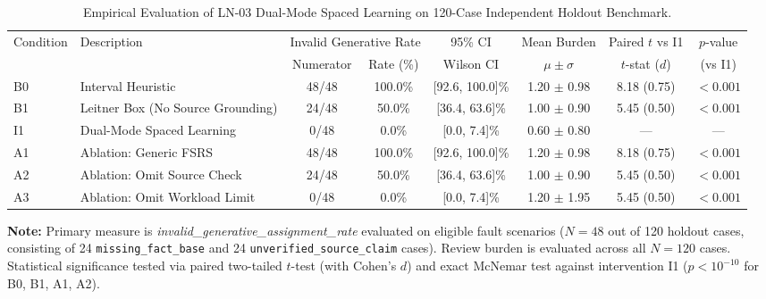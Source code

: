 \begin{table}[t]
\centering
\small
\caption{Empirical Evaluation of LN-03 Dual-Mode Spaced Learning on 120-Case Independent Holdout Benchmark.}
\label{tab:ln03-holdout-benchmark}
\begin{tabular}{llcccccc}
\toprule
Condition & Description & \multicolumn{2}{c}{Invalid Generative Rate} & 95\% CI & Mean Burden & Paired $t$ vs I1 & $p$-value \\
\cmidrule(lr){3-4} \cmidrule(lr){5-5} \cmidrule(lr){6-6} \cmidrule(lr){7-8}
 & & Numerator & Rate (\%) & Wilson CI & $\mu \pm \sigma$ & $t$-stat ($d$) & (vs I1) \\
\midrule
B0 & Interval Heuristic & 48/48 & 100.0\% & [92.6, 100.0]\% & 1.20 $\pm$ 0.98 & 8.18 (0.75) & $< 0.001$ \\
B1 & Leitner Box (No Source Grounding) & 24/48 & 50.0\% & [36.4, 63.6]\% & 1.00 $\pm$ 0.90 & 5.45 (0.50) & $< 0.001$ \\
I1 & Dual-Mode Spaced Learning & 0/48 & 0.0\% & [0.0, 7.4]\% & 0.60 $\pm$ 0.80 & --- & --- \\
A1 & Ablation: Generic FSRS & 48/48 & 100.0\% & [92.6, 100.0]\% & 1.20 $\pm$ 0.98 & 8.18 (0.75) & $< 0.001$ \\
A2 & Ablation: Omit Source Check & 24/48 & 50.0\% & [36.4, 63.6]\% & 1.00 $\pm$ 0.90 & 5.45 (0.50) & $< 0.001$ \\
A3 & Ablation: Omit Workload Limit & 0/48 & 0.0\% & [0.0, 7.4]\% & 1.20 $\pm$ 1.95 & 5.45 (0.50) & $< 0.001$ \\
\bottomrule
\end{tabular}
\par\smallskip
\begin{minipage}{0.98\textwidth}\footnotesize
\textbf{Note:} Primary measure is \textit{invalid\_generative\_assignment\_rate} evaluated on eligible fault scenarios ($N=48$ out of 120 holdout cases, consisting of 24 \texttt{missing\_fact\_base} and 24 \texttt{unverified\_source\_claim} cases). Review burden is evaluated across all $N=120$ cases. Statistical significance tested via paired two-tailed $t$-test (with Cohen's $d$) and exact McNemar test against intervention I1 ($p < 10^{-10}$ for B0, B1, A1, A2).
\end{minipage}
\end{table}

